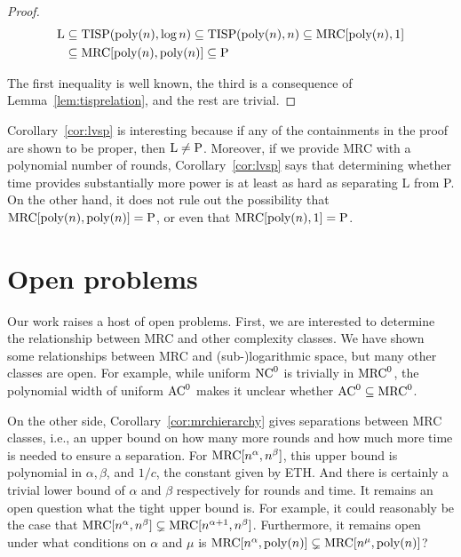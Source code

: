 \documentclass[letterpaper,USenglish]{lipics}
\theoremstyle{definition}
\theoremstyle{remark}
\newcommand{\mrc}{\textup{MRC}}
\newcommand{\TISP}{\textup{TISP}}
\renewcommand{\P}{\textup{P}}
\renewcommand{\L}{\textup{L}}
\begin{document}
\begin{proof}
\begin{align*}	\L &\subseteq \TISP(\textup{poly}(n), \log n) \subseteq
\TISP(\textup{poly}(n), n) \subseteq \mrc[\textup{poly}(n), 1] \\ &\subseteq
\mrc[\textup{poly}(n), \textup{poly}(n)] \subseteq \P \end{align*}

The first inequality is well known, the third is a consequence of
Lemma~\ref{lem:tisprelation}, and the rest are trivial.
\end{proof}

Corollary~\ref{cor:lvsp} is interesting because if any of the containments in
the proof are shown to be proper, then $\L \neq \P$. Moreover, if we provide
MRC with a polynomial number of rounds, Corollary~\ref{cor:lvsp} says that
determining whether time provides substantially more power is at least as hard
as separating L from P. On the other hand, it does not rule out the possibility
that $\mrc[\textup{poly}(n), \textup{poly}(n)] = \P$, or even that
$\mrc[\textup{poly}(n), 1] = \P$.

\section{Open problems}\label{sec:openproblems}

Our work raises a host of open problems. First, we are interested to determine
the relationship between MRC and other complexity classes. We have shown some
relationships between MRC and (sub-)logarithmic space, but many other classes
are open. For example, while uniform $\textup{NC}^0$ is trivially in $\mrc^0$,
the polynomial width of uniform $\textup{AC}^0$ makes it unclear whether
$\textup{AC}^0 \subseteq \mrc^0$.

On the other side, Corollary~\ref{cor:mrchierarchy} gives separations between
MRC classes, i.e., an upper bound on how many more rounds and how much more time
is needed to ensure a separation. For $\mrc[n^\alpha, n^\beta]$, this upper
bound is polynomial in $\alpha, \beta$, and $1/c$, the constant given by ETH.
And there is certainly a trivial lower bound of $\alpha$ and $\beta$
respectively for rounds and time. It remains an open question what the tight
upper bound is. For example, it could reasonably be the case that
$\mrc[n^\alpha,n^\beta]\subsetneq\mrc[n^{\alpha+1},n^{\beta}]$. Furthermore, it
remains open under what conditions on $\alpha$ and $\mu$ is $\mrc[n^\alpha,
\text{poly}(n)] \subsetneq \mrc[n^\mu, \text{poly}(n)]$?
\end{document}
